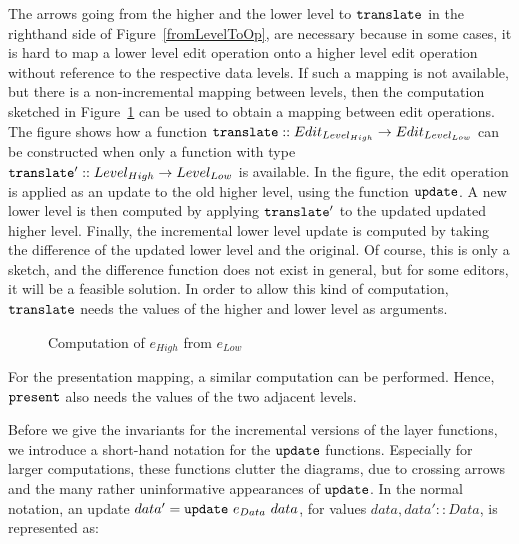 The arrows going from the higher and the lower level to ${\tt translate}$ in the righthand side of Figure~\ref{fromLevelToOp}, are necessary because in some cases, it is hard to map a lower level edit operation onto a higher level edit operation without reference to the respective data levels. If such a mapping is not available, but there is a non-incremental mapping between levels, then the computation sketched in Figure~\ref{computeOps} can be used to obtain a mapping between edit operations. The figure shows how a function ${\tt translate} :: Edit_{Level_{High}} \rightarrow Edit_{Level_{Low}}$ can be constructed when only a function with type ${\tt translate'} :: Level_{High} \rightarrow Level_{Low}$  is available. In the figure, the edit operation is applied as an update to the old higher level, using the function ${\tt update}$. A new lower level is then computed by applying ${\tt translate'}$ to the updated updated higher level. Finally, the incremental lower level update is computed by taking the difference of the updated lower level and the original. Of course, this is only a sketch, and the difference function does not exist in general, but for some editors, it will be a feasible solution. In order to allow this kind of computation, ${\tt translate}$ needs the values of the higher and lower level as arguments.

\begin{figure}
\begin{small}
\begin{center}
\begin{center}
\end{center}\caption{Computation of $e_{High}$ from $e_{Low}$}\label{computeOps} 
\end{center}
\end{small}
\end{figure}

For the presentation mapping, a similar computation can be performed. Hence, ${\tt present}$ also needs the values of the two adjacent levels. 

Before we give the invariants for the incremental versions of the layer functions, we introduce a short-hand notation for the ${\tt update}$ functions. Especially for larger computations, these functions clutter the diagrams, due to crossing arrows and the many rather uninformative appearances of ${\tt update}$. In the normal notation, an update $data' = {\tt update}~e_{Data}~data$, for values 
$data, data' :: Data$, is represented as:\\

